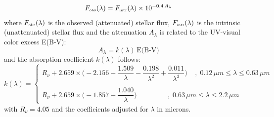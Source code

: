 \begin{equation}
    F_{\mbox{\tiny{obs}}}(\lambda) = F_{\mbox{\tiny{intr}}}(\lambda) \times 10^{-0.4 \, A_{\lambda}} \label{eq:dustatten} 
\end{equation}
where $F_{\mbox{\tiny{obs}}}(\lambda)$ is the observed (attenuated) stellar flux, $F_{\mbox{\tiny{intr}}}(\lambda)$ is the intrinsic (unattenuated) stellar flux and the attenuation $A_\lambda$ is related to the UV-visual color excess E(B-V):
\begin{equation}
    A_{\lambda} = k(\lambda)\, \mbox{E(B-V)} \label{eq:dustatten2} 
\end{equation}
and the absorption coefficient $k(\lambda)$ follows:
\begin{equation}
     k(\lambda)  = \begin{cases} R_{\nu} + 2.659 \times \Big( -2.156 + \dfrac{1.509}{\lambda} - \dfrac{0.198}{\lambda^2} + \dfrac{0.011}{\lambda^3}  \Big) \;\;\;\; ,\;0.12 \,μm \leq \lambda \leq 0.63 \, μm
    \\  \\ R_{\nu} +2.659 \times \Big( -1.857 + \dfrac{1.040}{\lambda}\Big) \;\;\;\;\;\;\;\;\;\;\;\;\;\;\;\; ,\;0.63 \,μm \leq \lambda \leq 2.2 \, μm \end{cases} \label{eq:dustatten3} 
\end{equation}
with $R_{\nu} = 4.05$ and the coefficients adjusted for $\lambda$ in microns.



